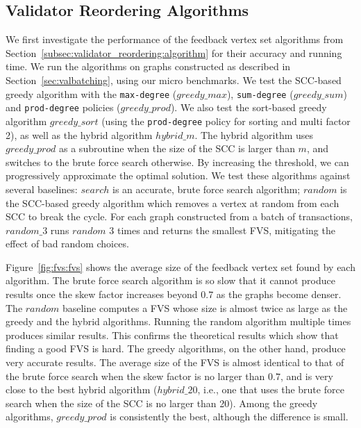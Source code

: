 \subsection{Validator Reordering Algorithms}
\label{sec:exp_algorithms}
We first investigate the performance of the feedback vertex set algorithms from Section~\ref{subsec:validator_reordering:algorithm} 
for their accuracy and running time. We run the algorithms on graphs constructed as described in Section~\ref{sec:valbatching}, using our micro benchmarks. 
We test the SCC-based greedy algorithm with the \texttt{max-degree} ($greedy\_max$), \texttt{sum-degree} ($greedy\_sum$) and \texttt{prod-degree} policies ($greedy\_prod$). We also test the sort-based greedy algorithm $greedy\_sort$ (using the \texttt{prod-degree} policy for sorting and multi factor 2), as well as the hybrid algorithm $hybrid\_m$. The hybrid algorithm uses $greedy\_prod$ as a subroutine when the size of the SCC is larger than $m$, and switches to the brute force search otherwise. By increasing the threshold, we can progressively approximate the optimal solution. 
We test these algorithms against several baselines: $search$ is an accurate,
brute force search algorithm; $random$ is the SCC-based greedy algorithm which
removes a vertex at random from each SCC to break the cycle. For each graph constructed from a batch of transactions,
$random\_3$ runs $random$ 3 times and returns the smallest FVS, mitigating the
effect of bad random choices.

Figure~\ref{fig:fvs:fvs} shows the average size of the feedback vertex set found by each algorithm. The brute force search algorithm is so slow that it cannot produce results once the skew factor increases beyond $0.7$ as the graphs become denser.
The $random$ baseline computes a FVS whose size is almost twice as large as the greedy and the hybrid algorithms. Running the random algorithm multiple times produces similar results. This confirms the theoretical results which show that finding a good FVS is hard. The greedy algorithms, on the other hand, produce very accurate results. The average size of the FVS is almost identical to that of the brute force search when the skew factor is no larger than $0.7$, and is very close to the best hybrid algorithm ($hybrid\_20$, i.e., one that uses the brute force search when the size of the SCC is no larger than 20). Among the greedy algorithms, $greedy\_prod$ is consistently the best, although the difference is small.

